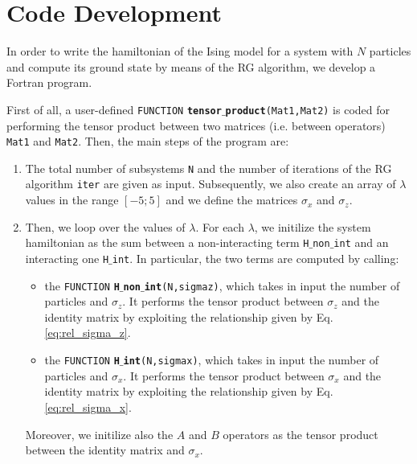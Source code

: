 \documentclass[rmp,10pt,onecolumn,fleqn,notitlepage]{revtex4-1}
\begin{document}
\clearpage



\section{Code Development}

In order to write the hamiltonian of the Ising model for a system with $N$ particles and compute its ground state by means of the RG algorithm, we develop a Fortran program.

First of all, a user-defined \texttt{FUNCTION} {\bfseries\texttt{tensor$\_$product}}\texttt{(Mat1,Mat2)} is coded for performing the tensor product between two matrices (i.e. between operators) \texttt{Mat1} and \texttt{Mat2}.
Then, the main steps of the program are:
\begin{enumerate}

\item The total number of subsystems \texttt{N} and the number of iterations of the RG algorithm \texttt{iter} are given as input. Subsequently, we also create an array of \( \lambda \) values in the range $[-5;5]$ and we define the matrices \( \sigma _x \) and \( \sigma _z \).

\item Then, we loop over the values of \( \lambda  \). For each \( \lambda  \), we initilize the system hamiltonian as the sum between a non-interacting term \texttt{H$\_$non$\_$int} and an interacting one \texttt{H$\_$int}. In particular, the two terms are computed by calling:
        \begin{itemize}

        \item the \texttt{FUNCTION} {\bfseries\texttt{H$\_$non$\_$int}}\texttt{(N,sigmaz)}, which takes in input the number of particles and \( \sigma _z \). It performs the tensor product between \( \sigma _z \) and the identity matrix by exploiting the relationship given by Eq. \eqref{eq:rel_sigma_z}.

        \item the \texttt{FUNCTION} {\bfseries\texttt{H$\_$int}}\texttt{(N,sigmax)}, which takes in input the number of particles and \( \sigma _x \). It performs the tensor product between \( \sigma _x \) and the identity matrix by exploiting the relationship given by Eq. \eqref{eq:rel_sigma_x}.
    \end{itemize}
Moreover, we initilize also the \( A \) and \( B \) operators as the tensor product between the identity matrix and \( \sigma _x \).


\end{enumerate}
\end{document}
